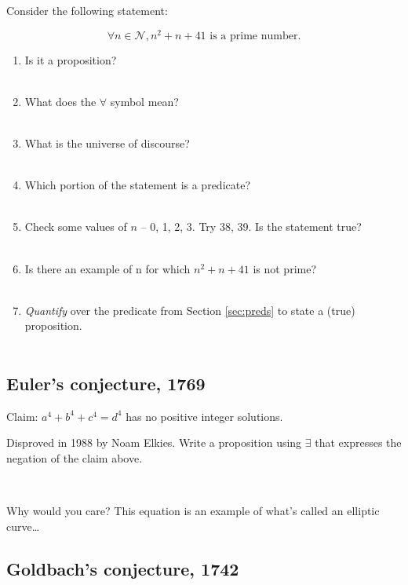 \documentclass[12pt]{article}
\begin{document}
Consider the following statement:

\[ \forall n \in \mathcal{N}, n^2 + n + 41 \textrm{~is a prime number.} \]

\begin{enumerate}
    \item Is it a proposition?\\~\\\emptybox{3em}
    \item What does the $\forall$ symbol mean?\\~\\\emptybox{3em}
    \item What is the universe of discourse?\\~\\\emptybox{3em}
    \item Which portion of the statement is a predicate?\\~\\\emptybox{3em}
    \item Check some values of $n$ -- 0, 1, 2, 3. Try 38, 39. Is the statement true?\\~\\\emptybox{3em}
    \item Is there an example of n for which $n^2 + n + 41$ is not prime?
            \\~\\\emptybox{3em}
    \item \emph{Quantify} over the predicate from Section \ref{sec:preds} to state a (true) proposition.
            \\~\\\emptybox{7em}
\end{enumerate}




\subsection{Euler's conjecture, 1769}

Claim: $a^4 + b^4 + c^4 = d^4$ has no positive integer solutions.

Disproved in 1988 by Noam Elkies. Write a proposition using $\exists$ that expresses the negation of the claim above.

~\\\emptybox{7em}

Why would you care? This equation is an example of what's called an elliptic curve\dots


\subsection{Goldbach's conjecture, 1742}
\end{document}
